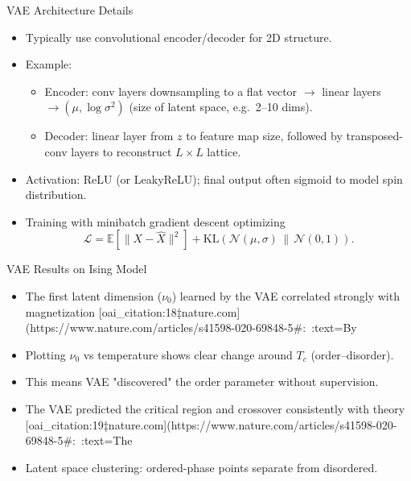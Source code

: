 \documentclass{beamer}
\begin{document}
\begin{frame}{VAE Architecture Details}
 \begin{itemize}
   \item Typically use convolutional encoder/decoder for 2D structure.
   \item Example:
     \begin{itemize}
       \item Encoder: conv layers downsampling to a flat vector $\rightarrow$ linear layers $\rightarrow (\mu, \log\sigma^2)$ (size of latent space, e.g.\ 2–10 dims).
       \item Decoder: linear layer from $z$ to feature map size, followed by transposed-conv layers to reconstruct $L\times L$ lattice.
     \end{itemize}
   \item Activation: ReLU (or LeakyReLU); final output often sigmoid to model spin distribution.
   \item Training with minibatch gradient descent optimizing
     \[
       \mathcal{L} = \mathbb{E}[\|X - \hat{X}\|^2] +
       \mathrm{KL}(\mathcal{N}(\mu,\sigma)\,\|\,\mathcal{N}(0,1)).
     \]
 \end{itemize}
\end{frame}

\begin{frame}{VAE Results on Ising Model}
 \begin{itemize}
   \item The first latent dimension ($\nu_0$) learned by the VAE correlated strongly with magnetization [oai_citation:18‡nature.com](https://www.nature.com/articles/s41598-020-69848-5#:~:text=By%
   \item Plotting $\nu_0$ vs temperature shows clear change around $T_c$ (order–disorder).
   \item This means VAE "discovered" the order parameter without supervision.
   \item The VAE predicted the critical region and crossover consistently with theory [oai_citation:19‡nature.com](https://www.nature.com/articles/s41598-020-69848-5#:~:text=The%
   \item Latent space clustering: ordered-phase points separate from disordered.
 \end{itemize}
\end{frame}
\end{document}
